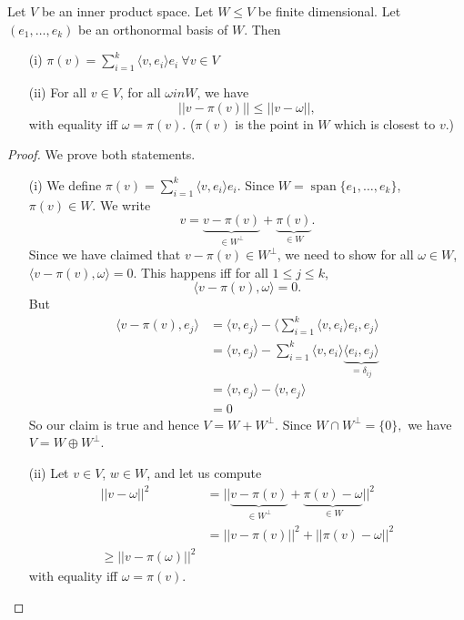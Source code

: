 \documentclass[a4paper]{scrartcl}
\begin{document}
\begin{lemma}
      Let $V$ be an inner product space. Let $W \leq V$ be finite dimensional. Let $(e_1, \ldots ,e_k)$ be an orthonormal basis of $W$. Then 
      \begin{itemize}
           \item[(i)] $\pi (v)=\sum_{i=1}^{k}\langle v,e_i\rangle  e_i  \ \forall v \in V $
           \item[(ii)] For all $v \in V$, for all $\omega in W$, we have 
           \[||v-\pi (v)||\leq ||v-\omega||,\]
           with equality iff $\omega=\pi (v)$. ($\pi (v)$ is the point in $W$ which is closest to $v$.)
      \end{itemize}
\end{lemma}
\begin{proof}
     We prove both statements.
      \begin{itemize}
           \item[(i)]We define $\pi (v)= \sum_{i=1}^{k}\langle v,e_i \rangle e_i$. Since $W=\operatorname{span}\{e_1,\ldots ,e_k\}$, $\pi (v) \in W$. We write 
           \[v=\underbrace{v-\pi (v)}_{\in W^\perp}+\underbrace{\pi (v)}_{\in W}.\]
           Since we have claimed that $v-\pi (v) \in W^\perp$, we need to show for all $\omega \in W$, $\langle v-\pi (v), \omega \rangle =0$. This happens iff for all $1 \leq j \leq k$, 
           \[\langle v-\pi (v),\omega \rangle=0 .\]
           But 
           \begin{align*}
                \langle v-\pi (v), e_j \rangle &=\langle v,e_j \rangle -\langle \sum_{i=1}^{k}\langle v,e_i \rangle e_i,e_j \rangle\\&=\langle v,e_j \rangle - \sum_{i=1}^{k}\langle v,e_i \rangle \underbrace{\langle e_i,e_j \rangle }_{=\delta_{ij}}\\&=\langle v,e_j \rangle -\langle v,e_j \rangle \\&=0
           \end{align*}
           So our claim is true and hence $V=W +W^\perp$. Since $W \cap W^\perp=\{0\},$ we have $V=W \oplus W^\perp$.
           \item[(ii)] Let $v \in V$, $w \in W$, and let us compute 
           \begin{align*}
                ||v-\omega||^2&=||\underbrace{v-\pi (v)}_{\in W^\perp}+\underbrace{\pi (v)-\omega}_{\in W}||^2\\
                &=||v-\pi (v)||^2+ ||\pi (v)-\omega||^2\\
                \geq ||v-\pi (\omega)||^2
           \end{align*}
          with equality iff $\omega=\pi (v)$.
      \end{itemize}
\end{proof}
\end{document}
